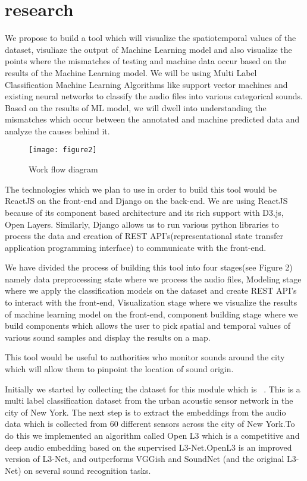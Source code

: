 	\section{research}
    We propose to build a tool which will visualize the spatiotemporal values of the dataset, visuliaze the output of Machine Learning model and also visualize the points where the mismatches of testing and machine data occur based on the results of the Machine Learning model. We will be using Multi Label Classification Machine Learning Algorithms like support vector machines and existing neural networks to classify the audio files into various categorical sounds. Based on the results of ML model, we will dwell into understanding the mismatches which occur between the annotated and machine predicted data and analyze the causes behind it. 
    
    	\begin{figure}[h!]
    	\texttt{[image: figure2]}
    	\caption{ Work flow diagram}
    \end{figure}
    
    The technologies which we plan to use in order to build this tool would be ReactJS on the front-end and Django on the back-end. We are using ReactJS because of its component based architecture and its rich support with D3.js, Open Layers. Similarly, Django allows us to run various python libraries to process the data and creation of REST API's(representational state transfer application programming interface) to communicate with the front-end. 
   
   	We have divided the process of building this tool into four stages(see Figure 2) namely data preprocessing state where we process the audio files, Modeling stage where we apply the classification models on the dataset and create REST API's to interact with the front-end, Visualization stage where we visualize the results of machine learning model on the front-end, component building stage where we build components which allows the user to pick spatial and temporal values of various sound samples and display the results on a map.
   	
   	
   	
    This tool would be useful to authorities who monitor sounds around the city which will allow them to pinpoint the location of sound origin.
    
    Initially we started by collecting the dataset for this module which is ~\cite{7}. This is a multi label classification dataset from the urban acoustic sensor network in the city of New York. The next step is to extract the embeddings from the audio data which is collected from 60 different sensors across the city of New York.To do this we implemented an algorithm called Open L3 which is a competitive and deep audio embedding based on the supervised L3-Net.OpenL3 is an improved version of L3-Net, and outperforms VGGish and SoundNet (and the original L3-Net) on several sound recognition tasks.
    

